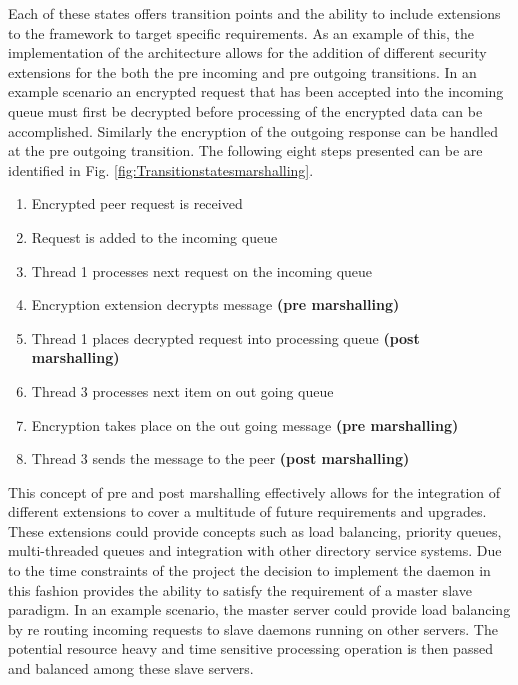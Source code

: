 {\begin{multicols}{3}
\begin{itemize}[itemsep=1pt,parsep=1pt]
				\end{itemize}
				
			\end{multicols}				
		
			Each of these states offers transition points and the ability to include extensions to the framework
			to target specific requirements.  As an example of this, the implementation of the architecture allows for the addition
			of different security extensions for the both the pre incoming and pre outgoing transitions.
			In an example scenario an encrypted request that has been accepted into the incoming queue must first be decrypted
			before processing of the encrypted data can be accomplished.  Similarly the encryption of the outgoing response
			can be handled at the pre outgoing transition.  The following eight steps presented can be are identified in Fig. \ref{fig:Transitionstatesmarshalling}.
			\newline
			
			\begin{enumerate}[itemsep=1pt,parsep=1pt]
				
				\item Encrypted peer request is received			
				\item Request is added to the incoming queue	
				\item Thread 1 processes next request on the incoming queue
				\item Encryption extension decrypts message \textbf{(pre marshalling)}
				\item Thread 1 places decrypted request into processing queue \textbf{(post marshalling)}
				\item Thread 3 processes next item on out going queue
				\item Encryption takes place on the out going message \textbf{(pre marshalling)}
				\item Thread 3 sends the message to the peer \textbf{(post marshalling)}
				
			\end{enumerate}
					
			\vspace{4mm}
			This concept of pre and post marshalling effectively allows for the integration of different extensions to cover a multitude of
			future requirements and upgrades. These extensions could provide concepts such as load balancing, priority queues,
			multi-threaded queues and integration with other directory service systems.  
			\newline
			\newline
			Due to the time constraints of the project the decision to implement the daemon in this fashion provides the ability
			to satisfy the requirement of a master slave paradigm.  In an example scenario, the master server could provide load balancing
			by re routing incoming requests to slave daemons running on other servers. The potential resource heavy and time sensitive processing operation
			is then passed and balanced among these slave servers.  
			\newline
			
}
